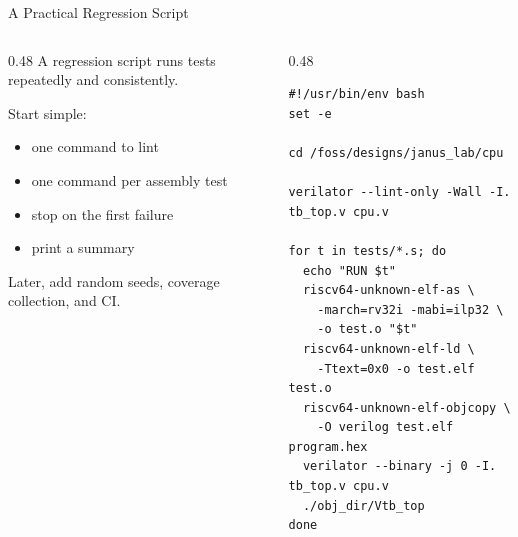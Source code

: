 \documentclass[aspectratio=169,10pt]{beamer}
\begin{document}
\begin{frame}[fragile]{A Practical Regression Script}
  \begin{columns}[T]
    \begin{column}{0.48\textwidth}
      A regression script runs tests repeatedly and consistently.

      \vspace{0.7em}
      Start simple:
      \begin{itemize}
        \item one command to lint
        \item one command per assembly test
        \item stop on the first failure
        \item print a summary
      \end{itemize}

      \vspace{0.7em}
      Later, add random seeds, coverage collection, and CI.
    \end{column}
    \begin{column}{0.48\textwidth}
\begin{lstlisting}[language=Shell]
#!/usr/bin/env bash
set -e

cd /foss/designs/janus_lab/cpu

verilator --lint-only -Wall -I. tb_top.v cpu.v

for t in tests/*.s; do
  echo "RUN $t"
  riscv64-unknown-elf-as \
    -march=rv32i -mabi=ilp32 \
    -o test.o "$t"
  riscv64-unknown-elf-ld \
    -Ttext=0x0 -o test.elf test.o
  riscv64-unknown-elf-objcopy \
    -O verilog test.elf program.hex
  verilator --binary -j 0 -I. tb_top.v cpu.v
  ./obj_dir/Vtb_top
done
\end{lstlisting}
    \end{column}
  \end{columns}
\end{frame}
\end{document}
